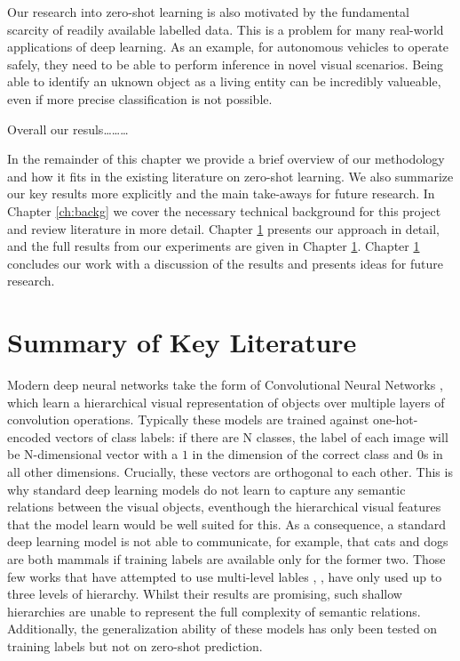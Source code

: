 \documentclass[12pt]{report}
\begin{document}
Our research into zero-shot learning is also motivated by the fundamental scarcity of readily available labelled data. This is a problem for many real-world applications of deep learning. As an example, for autonomous vehicles to operate safely, they need to be able to perform inference in novel visual scenarios. Being able to identify an uknown object as a living entity can be incredibly valueable, even if more precise classification is not possible.

Overall our resuls\dots\dots\dots

In the remainder of this chapter we provide a brief overview of our methodology and how it fits in the existing literature on zero-shot learning. We also summarize our key results more explicitly and the main take-aways for future research. In Chapter \ref{ch:backg} we cover the necessary technical background for this project and review literature in more detail. Chapter \ref{} presents our approach in detail, and the full results from our experiments are given in Chapter \ref{}. Chapter \ref{} concludes our work with a discussion of the results and presents ideas for future research.

\section{Summary of Key Literature}
Modern deep neural networks take the form of Convolutional Neural Networks \cite{Lecun2015}, which learn a hierarchical visual representation of objects over multiple layers of convolution operations. Typically these models are trained against one-hot-encoded vectors of class labels: if there are N classes, the label of each image will be N-dimensional vector with a $1$ in the dimension of the correct class and 0s in all other dimensions. Crucially, these vectors are orthogonal to each other. This is why standard deep learning models do not learn to capture any semantic relations between the visual objects, eventhough the hierarchical visual features that the model learn would be well suited for this. As a consequence, a standard deep learning model is not able to communicate, for example, that cats and dogs are both mammals if training labels are available only for the former two. Those few works that have attempted to use multi-level lables \cite{Wang2015}, \cite{Peterson2018}, have only used up to three levels of hierarchy. Whilst their results are promising, such shallow hierarchies are unable to represent the full complexity of semantic relations. Additionally, the generalization ability of these models has only been tested on training labels but not on zero-shot prediction.
\end{document}
